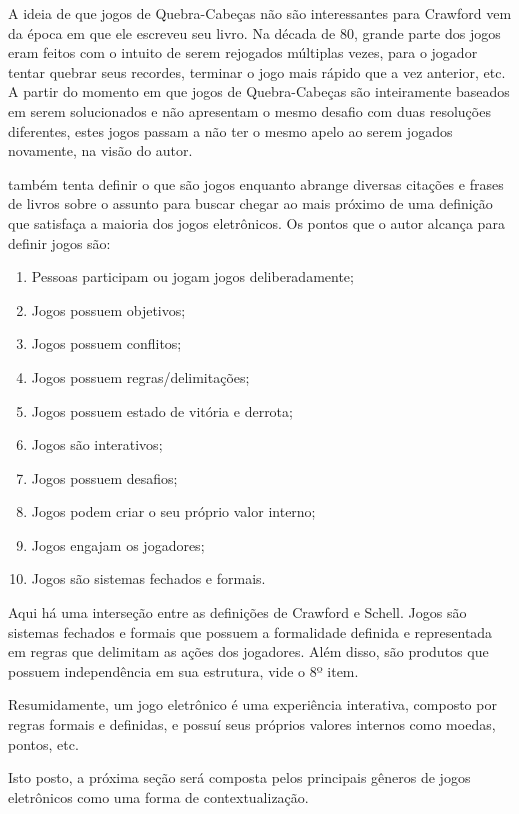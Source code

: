 A ideia de que jogos de Quebra-Cabeças não são interessantes para Crawford vem da época em que ele escreveu seu livro. Na década de 80, grande parte dos jogos eram feitos com o intuito de serem rejogados múltiplas vezes, para o jogador tentar quebrar seus recordes, terminar o jogo mais rápido que a vez anterior, etc. A partir do momento em que jogos de Quebra-Cabeças são inteiramente baseados em serem solucionados e não apresentam o mesmo desafio com duas resoluções diferentes, estes jogos passam a não ter o mesmo apelo ao serem jogados novamente, na visão do autor.

 também tenta definir o que são jogos enquanto abrange diversas citações e frases de livros sobre o assunto para buscar chegar ao mais próximo de uma definição que satisfaça a maioria dos jogos eletrônicos. Os pontos que o autor alcança para definir jogos são:

\begin{enumerate}
    \item Pessoas participam ou jogam jogos deliberadamente;
    \item Jogos possuem objetivos;
    \item Jogos possuem conflitos;
    \item Jogos possuem regras/delimitações;
    \item Jogos possuem estado de vitória e derrota;
    \item Jogos são interativos;
    \item Jogos possuem desafios;
    \item Jogos podem criar o seu próprio valor interno;
    \item Jogos engajam os jogadores;
    \item Jogos são sistemas fechados e formais.
\end{enumerate}

Aqui há uma interseção entre as definições de Crawford e Schell. Jogos são sistemas fechados e formais que possuem a formalidade definida e representada em regras que delimitam as ações dos jogadores. Além disso, são produtos que possuem independência em sua estrutura, vide o 8º item.

Resumidamente, um jogo eletrônico é uma experiência interativa, composto por regras formais e definidas, e possuí seus próprios valores internos como moedas, pontos, etc.

Isto posto, a próxima seção será composta pelos principais gêneros de jogos eletrônicos como uma forma de contextualização.

